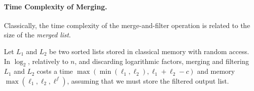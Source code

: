 %


\paragraph{Time Complexity of Merging.}
Classically, the time complexity of the merge-and-filter operation is related to the size of the \emph{merged list}.

\begin{lemma}
\label{lemma:classical-merging}
Let $L_1$ and $L_2$ be two sorted lists stored in classical memory with random access. 
In $\log_2$, relatively to $n$, and discarding logarithmic factors, merging and filtering $L_1$ and $L_2$ costs a time $\max( \min(\ell_1, \ell_2), \ell_1 + \ell_2 - c )$ and memory $\max( \ell_1, \ell_2, \ell^f)$, assuming that we must store the filtered output list.
\end{lemma}

